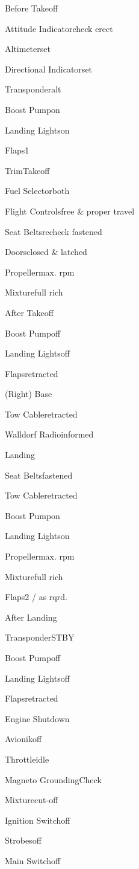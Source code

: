 \documentclass[12pt]{article}
\begin{document}
\begin{checklist}{Before Takeoff}
  \item{Attitude Indicator}{check erect}
  \item{Altimeter}{set}
  \item{Directional Indicator}{set}
  \item{Transponder}{alt}
  \item{Boost Pump}{on}
  \item{Landing Lights}{on}
  \item{Flaps}{1}
  \item{Trim}{Takeoff}
  \item{Fuel Selector}{both}
  \item{Flight Controls}{free \& proper travel}
  \item{Seat Belts}{recheck fastened}
  \item{Doors}{closed \& latched}
  \item{Propeller}{max. rpm}
  \item{Mixture}{full rich}
\end{checklist}

\begin{checklist}{After Takeoff}
  \item{Boost Pump}{off}
  \item{Landing Lights}{off}
  \item{Flaps}{retracted}
\end{checklist}

\begin{checklist}{(Right) Base}
  \item{Tow Cable}{retracted}
  \item{Walldorf Radio}{informed}
\end{checklist}

\begin{checklist}{Landing}
  \item{Seat Belts}{fastened}
  \item{Tow Cable}{retracted}
  \item{Boost Pump}{on}
  \item{Landing Lights}{on}
  \item{Propeller}{max. rpm}
  \item{Mixture}{full rich}
  \item{Flaps}{2 / as rqrd.}
\end{checklist}

\begin{checklist}{After Landing}
  \item{Transponder}{STBY}
  \item{Boost Pump}{off}
  \item{Landing Lights}{off}
  \item{Flaps}{retracted}
\end{checklist}

\begin{checklist}{Engine Shutdown}
  \item{Avionik}{off}
  \item{Throttle}{idle}
  \item{Magneto Grounding}{Check}
  \item{Mixture}{cut-off}
  \item{Ignition Switch}{off}
  \item{Strobes}{off}
  \item{Main Switch}{off}
\end{checklist}
\end{document}
